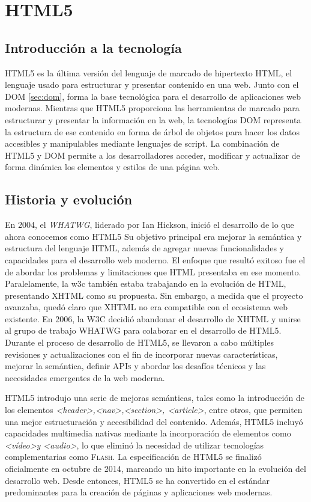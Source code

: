 \documentclass[a4paper, 11pt]{book}
\begin{document}
\section{HTML5}
\label{sec:html5}
\subsection{Introducción a la tecnología}
\textsc{HTML5} es la última versión del lenguaje de marcado de hipertexto \textsc{HTML}, el lenguaje usado para estructurar y presentar contenido en una web. Junto con el \textsc{DOM} \ref{sec:dom}, forma la base tecnológica para el desarrollo de aplicaciones web modernas. Mientras que \textsc{HTML5} proporciona las herramientas de marcado para estructurar y presentar la información en la web, la tecnologías \textsc{DOM} representa la estructura de ese contenido en forma de árbol de objetos para hacer los datos accesibles y manipulables mediante lenguajes de script.
La combinación de \textsc{HTML5} y \textsc{DOM} permite a los desarrolladores acceder, modificar y actualizar de forma dinámica los elementos y estilos de una página web.
\subsection{Historia y evolución}
En 2004, el \emph{WHATWG}, liderado por Ian Hickson, inició el desarrollo de lo que ahora conocemos como \textsc{HTML5}  Su objetivo principal era mejorar la semántica y estructura del lenguaje \textsc{HTML}, además de agregar nuevas funcionalidades y capacidades para el desarrollo web moderno. El enfoque que resultó exitoso fue el de abordar los problemas y limitaciones que \textsc{HTML} presentaba en ese momento.
Paralelamente, la \gls{w3c} también estaba trabajando en la evolución de \textsc{HTML}, presentando \textsc{XHTML} como su propuesta. Sin embargo, a medida que el proyecto avanzaba, quedó claro que \textsc{XHTML} no era compatible con el ecosistema web existente.
En 2006, la \textsc{W3C} decidió abandonar el desarrollo de \textsc{XHTML} y unirse al grupo de trabajo \textsc{WHATWG} para colaborar en el desarrollo de \textsc{HTML5}.
Durante el proceso de desarrollo de \textsc{HTML5}, se llevaron a cabo múltiples revisiones y actualizaciones con el fin de incorporar nuevas características, mejorar la semántica, definir \textsc{APIs} y abordar los desafíos técnicos y las necesidades emergentes de la web moderna.

\textsc{HTML5} introdujo una serie de mejoras semánticas, tales como la introducción de los elementos \emph{\textless header\textgreater ,\textless nav\textgreater,\textless section\textgreater, \textless article\textgreater}, entre otros, que permiten una mejor estructuración y accesibilidad del contenido. Además, \textsc{HTML5} incluyó capacidades multimedia nativas mediante la incorporación de elementos como \emph{\textless vídeo\textgreater y \textless audio\textgreater}, lo que eliminó la necesidad de utilizar tecnologías complementarias como \textsc{Flash}.
La especificación de \textsc{HTML5} se finalizó oficialmente en octubre de 2014, marcando un hito importante en la evolución del desarrollo web.
Desde entonces, \textsc{HTML5} se ha convertido en el estándar predominantes para la creación de páginas y aplicaciones web modernas.
\end{document}
